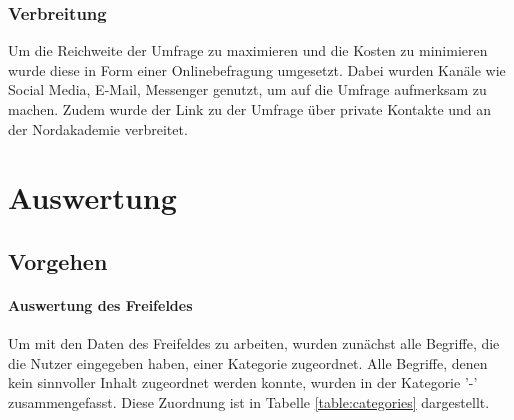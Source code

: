\documentclass[a4paper]{article}
\begin{document}
            \subsubsection{Verbreitung}
                Um die Reichweite der Umfrage zu maximieren und die Kosten zu minimieren wurde diese in Form einer Onlinebefragung umgesetzt. Dabei wurden Kanäle wie Social Media, E-Mail, Messenger genutzt, um auf die Umfrage aufmerksam zu machen. Zudem wurde der Link zu der Umfrage über private Kontakte und an der Nordakademie verbreitet.
                
    \section{Auswertung}
        \subsection{Vorgehen}\label{section:auswertung:vorgehen}
            \paragraph{Auswertung des Freifeldes}
                Um mit den Daten des Freifeldes zu arbeiten, wurden zunächst alle Begriffe, die die Nutzer eingegeben haben, einer Kategorie zugeordnet. Alle Begriffe, denen kein sinnvoller Inhalt zugeordnet werden konnte, wurden in der Kategorie '-' zusammengefasst. Diese Zuordnung ist in Tabelle \ref{table:categories} dargestellt.\\
\end{document}
